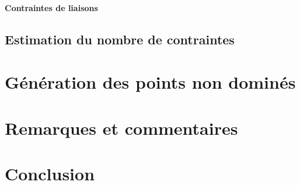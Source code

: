 \documentclass{report}
\begin{document}
  \subsubsection{Contraintes de liaisons}
\section{Estimation du nombre de contraintes}

\chapter{Génération des points non dominés}
\chapter{Remarques et commentaires}
\chapter{Conclusion}
\end{document}
